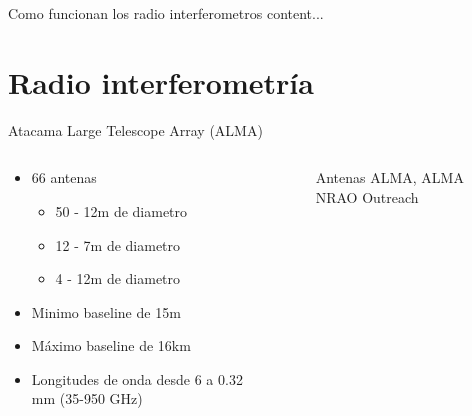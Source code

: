 \documentclass[xetex,aspectratio=169]{beamer}
\begin{document}
	\begin{frame}{Como funcionan los radio interferometros}
		content...
	\end{frame}
	
    \section{Radio interferometría}
    \begin{frame}{Atacama Large Telescope Array (ALMA)}
    	\begin{columns}
    		\begin{column}{0.48\textwidth}
    			\begin{itemize}
    				\item 66 antenas
    				\begin{itemize}
    					\item 50 - 12m de diametro
    					\item 12 - 7m de diametro
    					\item 4 - 12m de diametro
    				\end{itemize}
    				\item Minimo baseline de 15m
    				\item Máximo baseline de 16km
    				\item Longitudes de onda desde 6 a 0.32 mm (35-950 GHz)
    			\end{itemize}
    		\end{column}
    		\begin{column}{0.48\textwidth}
    			\begin{figure}
    				\centering		
    				\caption*{Antenas ALMA, ALMA NRAO Outreach}
    		\end{figure}
    		\end{column}
    	\end{columns}
    \end{frame}
\end{document}
